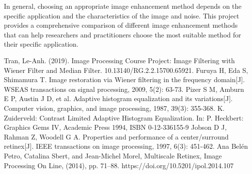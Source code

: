 \documentclass[conference]{IEEEtran}
\begin{document}
In general, choosing an appropriate image enhancement method depends on the specific application and the characteristics of the image and noise. This project provides a comprehensive comparison of different image enhancement methods that can help researchers and practitioners choose the most suitable method for their specific application.


\begin{thebibliography}{00}
 Tran, Le-Anh. (2019). Image Processing Course Project: Image Filtering with Wiener Filter and Median Filter. 10.13140/RG.2.2.15700.65921.
 Furuya H, Eda S, Shimamura T. Image restoration via Wiener filtering in the frequency domain[J]. WSEAS transactions on signal processing, 2009, 5(2): 63-73.
Pizer S M, Amburn E P, Austin J D, et al. Adaptive histogram equalization and its variations[J]. Computer vision, graphics, and image processing, 1987, 39(3): 355-368.
K. Zuiderveld: Contrast Limited Adaptive Histogram Equalization. In: P. Heckbert: Graphics Gems IV, Academic Press 1994, ISBN 0-12-336155-9
Jobson D J, Rahman Z, Woodell G A. Properties and performance of a center/surround retinex[J]. IEEE transactions on image processing, 1997, 6(3): 451-462.
Ana Belén Petro, Catalina Sbert, and Jean-Michel Morel, Multiscale Retinex, Image Processing On Line, (2014), pp. 71–88. https://doi.org/10.5201/ipol.2014.107

\end{thebibliography}
\end{document}

